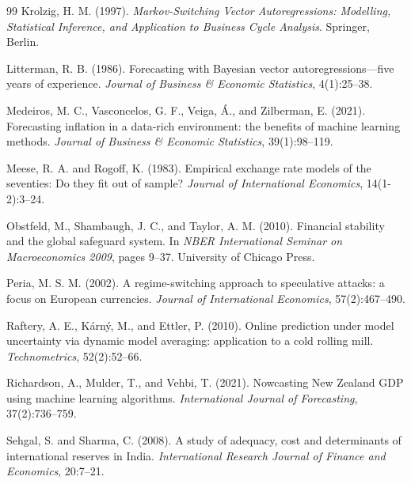 \documentclass[12pt,a4paper]{article}
\begin{document}
\begin{thebibliography}{99}
Krolzig, H. M. (1997).
\newblock \textit{Markov-Switching Vector Autoregressions: Modelling, Statistical Inference, and Application to Business Cycle Analysis}.
\newblock Springer, Berlin.

Litterman, R. B. (1986).
\newblock Forecasting with Bayesian vector autoregressions---five years of experience.
\newblock \textit{Journal of Business \& Economic Statistics}, 4(1):25--38.

Medeiros, M. C., Vasconcelos, G. F., Veiga, \'{A}., and Zilberman, E. (2021).
\newblock Forecasting inflation in a data-rich environment: the benefits of machine learning methods.
\newblock \textit{Journal of Business \& Economic Statistics}, 39(1):98--119.

Meese, R. A. and Rogoff, K. (1983).
\newblock Empirical exchange rate models of the seventies: Do they fit out of sample?
\newblock \textit{Journal of International Economics}, 14(1-2):3--24.

Obstfeld, M., Shambaugh, J. C., and Taylor, A. M. (2010).
\newblock Financial stability and the global safeguard system.
\newblock In \textit{NBER International Seminar on Macroeconomics 2009}, pages 9--37. University of Chicago Press.

Peria, M. S. M. (2002).
\newblock A regime-switching approach to speculative attacks: a focus on European currencies.
\newblock \textit{Journal of International Economics}, 57(2):467--490.

Raftery, A. E., K\'{a}rn\'{y}, M., and Ettler, P. (2010).
\newblock Online prediction under model uncertainty via dynamic model averaging: application to a cold rolling mill.
\newblock \textit{Technometrics}, 52(2):52--66.

Richardson, A., Mulder, T., and Vehbi, T. (2021).
\newblock Nowcasting New Zealand GDP using machine learning algorithms.
\newblock \textit{International Journal of Forecasting}, 37(2):736--759.

Sehgal, S. and Sharma, C. (2008).
\newblock A study of adequacy, cost and determinants of international reserves in India.
\newblock \textit{International Research Journal of Finance and Economics}, 20:7--21.


\end{thebibliography}
\end{document}
